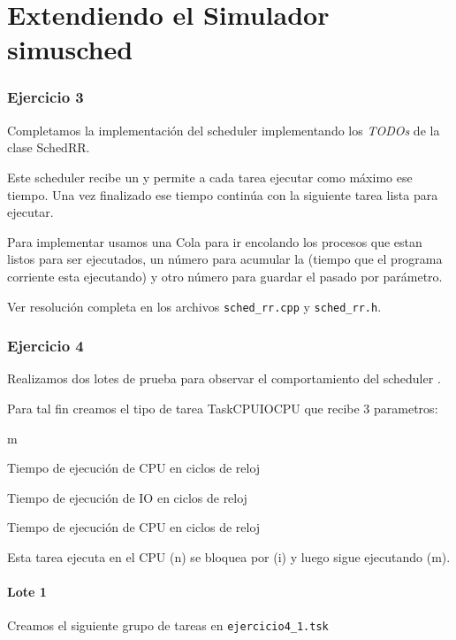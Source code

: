 


\part{Extendiendo el Simulador simusched}

\section{Ejercicio 3}

Completamos la implementaci\'on del scheduler \rr implementando los \textit{TODOs} de la clase SchedRR.

Este scheduler recibe un \quantum y permite a cada tarea ejecutar como m\'aximo ese tiempo. Una vez finalizado ese tiempo contin\'ua con la siguiente tarea lista para ejecutar.

Para implementar \rr usamos una Cola para ir encolando los procesos que estan listos para ser ejecutados, un n\'umero para acumular la \quota (tiempo que el programa corriente esta ejecutando) y otro n\'umero para guardar el \quantum pasado por par\'ametro.

Ver resoluci\'on completa en los archivos \verb|sched_rr.cpp| y \verb|sched_rr.h|.

\section{Ejercicio 4}

Realizamos dos lotes de prueba para observar el comportamiento del scheduler \rr. 

Para tal fin creamos el tipo de tarea TaskCPUIOCPU que recibe 3 parametros:

\begin{mydescription}{m}
 \item[n] Tiempo de ejecuci\'on de CPU en ciclos de reloj
 \item[i] Tiempo de ejecuci\'on de IO en ciclos de reloj
 \item[m] Tiempo de ejecuci\'on de CPU en ciclos de reloj
\end{mydescription}

Esta tarea ejecuta en el CPU (n) se bloquea por (i) y luego sigue ejecutando (m).

\subsection{Lote 1}

Creamos el siguiente grupo de tareas en \verb|ejercicio4_1.tsk|

